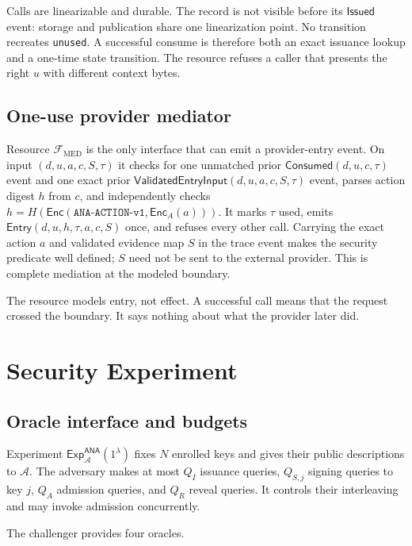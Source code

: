 \documentclass[10pt]{article}
\newcommand{\code}[1]{\texttt{#1}}
\newcommand{\Enc}{\mathsf{Enc}}
\newcommand{\ANA}{\mathsf{ANA}}
\newcommand{\Entry}{\mathsf{Entry}}
\begin{document}
Calls are linearizable and durable. The record is not visible before its
$\mathsf{Issued}$ event: storage and publication share one linearization point.
No transition recreates \code{unused}. A successful consume is therefore both
an exact issuance lookup and a one-time state transition. The resource refuses
a caller that presents the right $u$ with different context bytes.

\subsection{One-use provider mediator}

Resource $\mathcal F_{\mathrm{MED}}$ is the only interface that can emit a
provider-entry event. On input $(d,u,a,c,S,\tau)$ it checks for one unmatched prior
$\mathsf{Consumed}(d,u,c,\tau)$ event and one exact prior
$\mathsf{ValidatedEntryInput}(d,u,a,c,S,\tau)$ event, parses action digest $h$
from $c$, and independently checks
$h=H(\Enc(\code{ANA-ACTION-v1},\Enc_A(a)))$. It marks $\tau$ used, emits
$\Entry(d,u,h,\tau,a,c,S)$ once, and refuses every other call. Carrying the
exact action $a$ and validated evidence map $S$ in the trace event makes the
security predicate well defined; $S$ need not be sent to the external provider.
This is complete mediation at the modeled boundary.

The resource models entry, not effect. A successful call means that the request
crossed the boundary. It says nothing about what the provider later did.

\section{Security Experiment}
\label{sec:experiment}

\subsection{Oracle interface and budgets}

Experiment $\mathsf{Exp}^{\ANA}_{\mathcal A}(1^\lambda)$ fixes $N$ enrolled keys
and gives their public descriptions to $\mathcal A$. The adversary makes at most
$Q_I$ issuance queries, $Q_{S,j}$ signing queries to key $j$, $Q_A$ admission
queries, and $Q_R$ reveal queries. It controls their interleaving and may invoke
admission concurrently.

The challenger provides four oracles.
\end{document}
